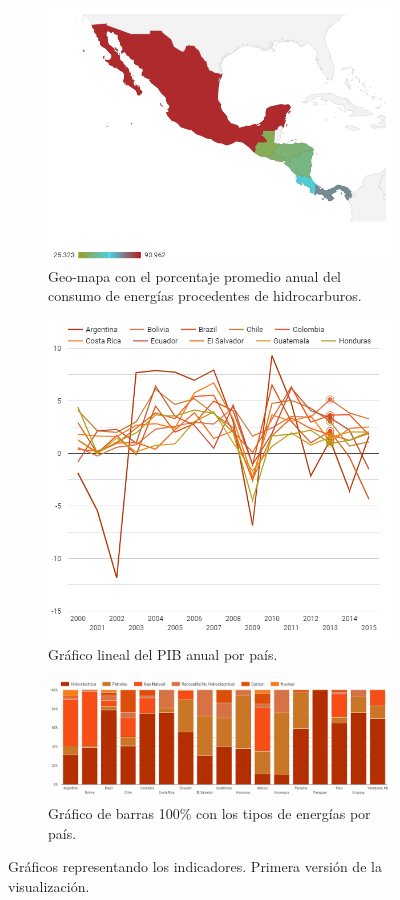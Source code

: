 \documentclass[spanish, letterpaper, 12 pt, conference]{ieeeconf}  %
\begin{document}
\begin{figure}[h]
\begin{subfigure}{\textwidth}
  \centering
  \includegraphics[width=.8\linewidth]{./img/mapav1.png}
  \caption{Geo-mapa con el porcentaje promedio anual del consumo de energías procedentes de hidrocarburos. }
  \label{fig:mapv1}
\end{subfigure}%
\begin{subfigure}{\textwidth}
  \centering
  \includegraphics[width=.8\linewidth]{./img/PIBv1.png}
  \caption{Gráfico lineal del PIB anual por país.}
  \label{fig:pibv1}
\end{subfigure}
\begin{subfigure}{\textwidth}
  \centering
  \includegraphics[width=.8\linewidth]{./img/tiposv1.png}
  \caption{Gráfico de barras 100\% con los tipos de energías por país.}
  \label{fig:tiposv1}
\end{subfigure}
\caption{Gráficos representando los indicadores. Primera versión de la visualización.}
\label{fig:version_1}
\end{figure}
\end{document}
